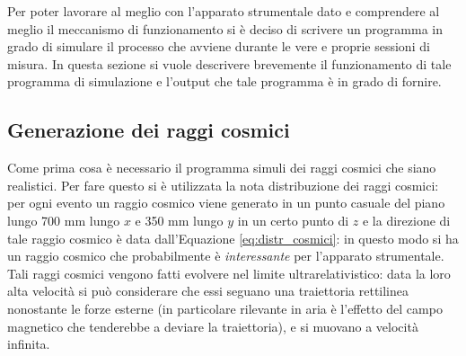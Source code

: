 Per poter lavorare al meglio con l'apparato strumentale dato e comprendere al meglio il meccanismo di funzionamento si è deciso di scrivere un programma in grado di simulare
il processo che avviene durante le vere e proprie sessioni di misura. In questa sezione si vuole descrivere brevemente il funzionamento di tale programma di simulazione e
l'output che tale programma è in grado di fornire.
\subsection{Generazione dei raggi cosmici}
Come prima cosa è necessario il programma simuli dei raggi cosmici che siano realistici. Per fare questo si è utilizzata la nota distribuzione dei raggi cosmici:
% 
per ogni evento un raggio cosmico viene generato in un punto casuale del piano lungo 700 mm lungo $x$ e 350 mm lungo $y$ in un certo punto di $z$ e la direzione di tale
raggio cosmico è data dall'Equazione \ref{eq:distr_cosmici}: in questo modo si ha un raggio cosmico che probabilmente è \textit{interessante} per l'apparato strumentale.
Tali raggi cosmici vengono fatti evolvere nel limite ultrarelativistico: data la loro alta velocità si può considerare che essi seguano una traiettoria rettilinea nonostante
le forze esterne (in particolare rilevante in aria è l'effetto del campo magnetico che tenderebbe a deviare la traiettoria), e si muovano a velocità infinita.

